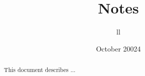 \documentclass[notoc]{tufte-handout}
\title{Notes}
\author{ll}
\date{October 20024}  %
\numberwithin{equation}{section}
\begin{document}
\maketitle%


\begin{abstract}
\noindent This document describes ...
\end{abstract}

\tableofcontents







\newpage




\end{document}
